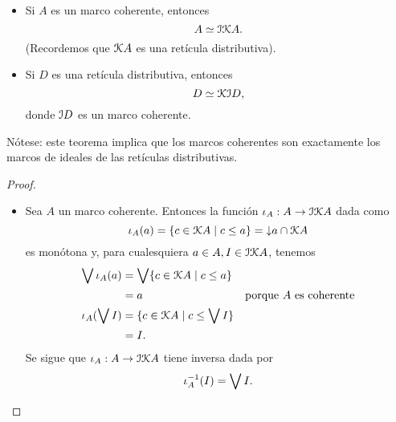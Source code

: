 \begin{theorem}
    \begin{itemize}
        \item Si $A$ es un marco coherente, entonces
        \[
            A\simeq \cal I\cal KA
        .\]
        (Recordemos que $\cal KA$ es una retícula distributiva).
        \item Si $D$ es una retícula distributiva, entonces
        \[
            D \simeq \cal K\cal ID
        ,\]
        donde $\cal ID$ es un marco coherente.
    \end{itemize}
    Nótese: este teorema implica que los marcos coherentes
    son exactamente los marcos de ideales de las retículas
    distributivas.
\end{theorem}
\begin{proof}
    \begin{itemize}
        \item
        Sea $A$ un marco coherente.
        Entonces la función $\iota_A:A\to\cal I\cal KA$ dada como
        \[
            \iota_A(a) = \{c\in\cal KA\mid c\leq a\}
            =\down a\cap\cal KA
        \]
        es monótona y, para cualesquiera $a\in A, I\in\cal I\cal KA$,
        tenemos
        \begin{align*}
            \Sup\iota_A(a)
            &= \Sup\{c\in\cal KA\mid c\leq a\} \\
            &= a & \text{porque $A$ es coherente} \\
            \iota_A(\Sup I)
            &= \{c\in\cal KA\mid c\leq \Sup I\} \\
            &= I.
        \end{align*}
        Se sigue que $\iota_A:A\to\cal I\cal KA$ tiene inversa
        dada por
        \[
            \iota_A^{-1}(I) = \Sup I
        .\]
        

\end{itemize}
\end{proof}

